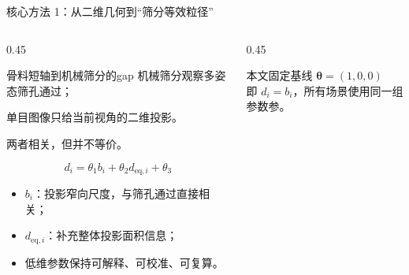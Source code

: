 \documentclass[UTF8,aspectratio=169,11pt]{ctexbeamer}
\begin{document}
\begin{frame}{核心方法 1：从二维几何到“筛分等效粒径”}
\begin{columns}[T]
\begin{column}{0.45\textwidth}
\begin{block}{骨料短轴到机械筛分的gap}
\small 机械筛分观察多姿态筛孔通过；

单目图像只给当前视角的二维投影。

两者相关，但并不等价。
\end{block}
\vspace{0.4em}
\centering
{\Large
\[
 d_i=\theta_1 b_i+\theta_2 d_{\mathrm{eq},i}+\theta_3
\]
}
\vspace{-0.4em}
\begin{itemize}\footnotesize
  \item $b_i$：投影窄向尺度，与筛孔通过直接相关；
  \item $d_{\mathrm{eq},i}$：补充整体投影面积信息；
  \item 低维参数保持可解释、可校准、可复算。
\end{itemize}
\end{column}
\begin{column}{0.45\textwidth}
\begin{alertblock}{本文固定基线}
\centering
{\Large $\boldsymbol{\theta}=(1,0,0)$}\\[0.4em]
\small 即 $d_i=b_i$，所有场景使用同一组参数参。
\end{alertblock}
\vspace{0.4em}
\end{column}
\end{columns}
\end{frame}
\end{document}
